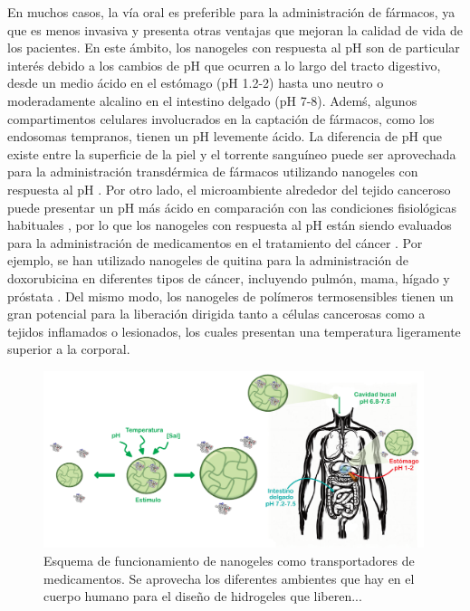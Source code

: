 En muchos casos, la v\'ia oral es preferible para la administraci\'on de f\'armacos, ya que es menos invasiva y presenta otras ventajas que mejoran la calidad de vida de los pacientes. En este \'ambito, los nanogeles con respuesta al pH son de particular inter\'es debido a los cambios de pH que ocurren a lo largo del tracto digestivo, desde un medio \'acido en el est\'omago (pH 1.2-2) hasta uno neutro o moderadamente alcalino en el intestino delgado (pH 7-8). Adem\'s, algunos compartimentos celulares involucrados en la captaci\'on de f\'armacos, como los endosomas tempranos, tienen un pH levemente \'acido. La diferencia de pH que existe entre la superficie de la piel  y el torrente sangu\'ineo puede ser aprovechada para la administraci\'on transd\'ermica de f\'armacos utilizando nanogeles con respuesta al pH \cite{qindeel2019development}. Por otro lado, el microambiente alrededor del tejido canceroso puede presentar un pH m\'as \'acido en comparaci\'on con las condiciones fisiol\'ogicas habituales \cite{lawson1963breast,tannock1989acid,gerweck2006tumor}, por lo que los nanogeles con respuesta al pH est\'an siendo evaluados para la administraci\'on de medicamentos en el tratamiento del c\'ancer \cite{peng2013controlled,kanamala2016mechanisms}. Por ejemplo, se han utilizado nanogeles de quitina para la administraci\'on de doxorubicina en diferentes tipos de c\'ancer, incluyendo pulm\'on, mama, h\'igado y pr\'ostata \cite{jayakumar2012doxorubicin}. Del mismo modo, los nanogeles de pol\'imeros termosensibles tienen un gran potencial para la liberaci\'on dirigida tanto a c\'elulas cancerosas como a tejidos inflamados o lesionados, los cuales presentan una temperatura ligeramente superior a la corporal.
	


\begin{figure}
	\centering
	\includegraphics[width=0.99\textwidth]{Figures/modelos/sistema.pdf}
	\caption{Esquema de funcionamiento de nanogeles como transportadores de medicamentos. Se aprovecha los diferentes ambientes que hay en el cuerpo humano para el dise\~no de hidrogeles que liberen... }
	\label{fig:intro:sistema}
\end{figure}


